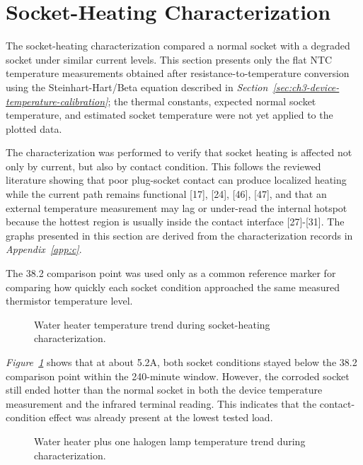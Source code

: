 \section{Socket-Heating Characterization}
\label{sec:ch4-socket-heating-characterization}

The socket-heating characterization compared a normal socket with a degraded
socket under similar current levels. This section presents only the flat NTC
temperature measurements obtained after resistance-to-temperature conversion
using the Steinhart-Hart/Beta equation described in
\textit{Section~\ref{sec:ch3-device-temperature-calibration}}; the thermal
constants, expected normal socket temperature, and estimated socket temperature
were not yet applied to the plotted data.

The characterization was performed to verify that socket heating is affected not
only by current, but also by contact condition. This follows the reviewed
literature showing that poor plug-socket contact can produce localized heating
while the current path remains functional [17], [24], [46], [47], and that an
external temperature measurement may lag or under-read the internal hotspot
because the hottest region is usually inside the contact interface [27]-[31].
The graphs presented in this section are derived from the characterization
records in \textit{Appendix~\ref{app:c}}.

The 38.2{\degreeC} comparison point was used only as a common reference marker
for comparing how quickly each socket condition approached the same measured
thermistor temperature level.

\begin{figure}[H]
  \centering
  \caption{Water heater temperature trend during socket-heating characterization.}
  \label{fig:ch4-char-water-heater}
\end{figure}

\textit{Figure~\ref{fig:ch4-char-water-heater}} shows that at about 5.2A, both
socket conditions stayed below the 38.2{\degreeC} comparison point within the
240-minute window. However, the corroded socket still ended hotter than the
normal socket in both the device temperature measurement and the infrared
terminal reading. This indicates that the contact-condition effect was already
present at the lowest tested load.

\begin{figure}[H]
  \centering
  \caption{Water heater plus one halogen lamp temperature trend during characterization.}
  \label{fig:ch4-char-one-lamp}
\end{figure}

